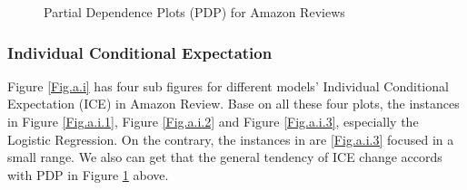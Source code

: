 \documentclass{article}
\begin{document}
\addtocounter{figure}{-1}   
\begin{figure} 
\addtocounter{figure}{1}      
\centering 
{}
\caption{Partial Dependence Plots (PDP) for Amazon Reviews}
\label{Fig.a.p}
\end{figure}



\subsubsection{Individual Conditional Expectation}
Figure \ref{Fig.a.i} has four sub figures for different models' Individual Conditional Expectation (ICE) in Amazon Review. Base on all these four plots, the instances in Figure \ref{Fig.a.i.1}, Figure \ref{Fig.a.i.2} and Figure \ref{Fig.a.i.3}, especially the Logistic Regression. On the contrary, the instances in are \ref{Fig.a.i.3} focused in a small range. We also can get that the general tendency of ICE change accords with PDP in Figure \ref{Fig.a.p} above.
\end{document}
